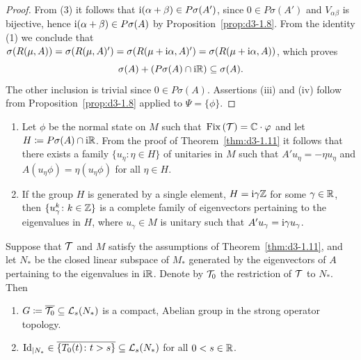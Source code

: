 \begin{proof}
From (3) it follows that $\mathrm{i}(\alpha+\beta) \in P\sigma(A')$, since $0 \in P\sigma(A')$ and $V_{\alpha\beta}$ is bijective, hence $\mathrm{i}(\alpha+\beta) \in P\sigma(A)$ by Proposition~\ref{prop:d3-1.8}.
From the identity (1) we conclude that $\sigma(R(\mu,A)) = \sigma(R(\mu,A)') = \sigma(R(\mu+\mathrm{i}\alpha,A)') = \sigma(R(\mu+\mathrm{i}\alpha,A))$, which proves
\[
\sigma(A) + (P\sigma(A) \cap \mathrm{i}\mathbb{R}) \subseteq \sigma(A).
\]
The other inclusion is trivial since $0 \in P\sigma(A)$.
Assertions (iii) and (iv) follow from Proposition~\ref{prop:d3-1.8} applied to $\Psi = \{\phi\}$.
\end{proof}
\begin{remarks}\label{rem:d3-1.12}
\begin{enumerate}[\upshape (i), wide, labelindent=.25em]

\item 
Let $\phi$ be the normal state on $M$ such that 
$\Fix{\TT} = \C \cdot \phi$ and let $H \coloneq P\sigma(A) \cap \mathrm{i}\mathbb{R}$.
From the proof of Theorem~\ref{thm:d3-1.11} it follows that there exists a family $\{u_{\eta} \colon \eta \in H\}$ of unitaries in $M$ such that $A'u_{\eta} = -\eta u_{\eta}$ and $A(u_{\eta}\phi) = \eta(u_{\eta}\phi)$ for all $\eta \in H$.

\item 
If the group $H$ is generated by a single element, \ie $H = \mathrm{i}\gamma\mathbb{Z}$ for some $\gamma \in \mathbb{R}$, then 
$\{u_{\gamma}^{k} \colon k \in \mathbb{Z}\}$ 
is a complete family of eigenvectors pertaining to the eigenvalues in $H$, where $u_{\gamma} \in M$ is unitary such that $A'u_{\gamma} = \mathrm{i}\gamma u_{\gamma}$.

\end{enumerate}
\end{remarks}
\begin{proposition}\label{prop:d3-1.13}
Suppose that $\mathcal{T}$ and $M$ satisfy the assumptions of Theorem~\ref{thm:d3-1.11}, and let $N_{*}$ be the closed linear subspace of\/ $M_{*}$ generated by the eigenvectors of\/ $A$ pertaining to the eigenvalues in $\mathrm{i}\mathbb{R}$.
Denote by $\mathcal{T}_{0}$ the restriction of\/ $\mathcal{T}$ to $N_{*}$.
Then
\begin{enumerate}[\upshape (i)]
 
\item 
$G \coloneq \overline{\mathcal{T}_{0}} \subseteq \mathcal{L}_{s}(N_{*})$ is a compact, Abelian group in the strong operator topology.

\item 
$\operatorname{Id}_{| N_{{*}}} \in \overline{\{T_{0}(t) \colon t>s\}} \subseteq \mathcal{L}_{s}(N_{*})$ for all $0<s \in \mathbb{R}$.
\end{enumerate}
\end{proposition}
